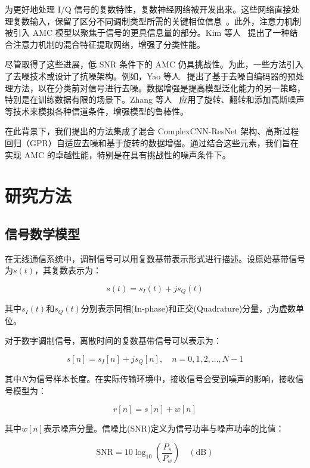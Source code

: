 \documentclass[conference]{IEEEtran}
\begin{document}
为更好地处理 I/Q 信号的复数特性，复数神经网络被开发出来。这些网络直接处理复数输入，保留了区分不同调制类型所需的关键相位信息~\cite{li2023lightweight}。此外，注意力机制被引入 AMC 模型以聚焦于信号的更具信息量的部分。Kim 等人~\cite{kim2020efficient} 提出了一种结合注意力机制的混合特征提取网络，增强了分类性能。

尽管取得了这些进展，低 SNR 条件下的 AMC 仍具挑战性。为此，一些方法引入了去噪技术或设计了抗噪架构。例如，Yao 等人~\cite{yao2019modulation} 提出了基于去噪自编码器的预处理方法，以在分类前对信号进行去噪。数据增强是提高模型泛化能力的另一策略，特别是在训练数据有限的场景下。Zhang 等人~\cite{zhang2023efficient} 应用了旋转、翻转和添加高斯噪声等技术来模拟各种信道条件，增强模型的鲁棒性。

在此背景下，我们提出的方法集成了混合 ComplexCNN-ResNet 架构、高斯过程回归（GPR）自适应去噪和基于旋转的数据增强。通过结合这些元素，我们旨在实现 AMC 的卓越性能，特别是在具有挑战性的噪声条件下。


\section{研究方法}

\subsection{信号数学模型}

在无线通信系统中，调制信号可以用复数基带表示形式进行描述。设原始基带信号为$s(t)$，其复数表示为：

\begin{equation}
s(t) = s_I(t) + js_Q(t)
\end{equation}

其中$s_I(t)$和$s_Q(t)$分别表示同相(In-phase)和正交(Quadrature)分量，$j$为虚数单位。

对于数字调制信号，离散时间的复数基带信号可以表示为：

\begin{equation}
s[n] = s_I[n] + js_Q[n], \quad n = 0, 1, 2, ..., N-1
\end{equation}

其中$N$为信号样本长度。在实际传输环境中，接收信号会受到噪声的影响，接收信号模型为：

\begin{equation}
r[n] = s[n] + w[n]
\end{equation}

其中$w[n]$表示噪声分量。信噪比(SNR)定义为信号功率与噪声功率的比值：

\begin{equation}
\mathrm{SNR} = 10\log_{10}\left(\frac{P_s}{P_w}\right) \quad(\mathrm{dB})
\end{equation}
\end{document}
